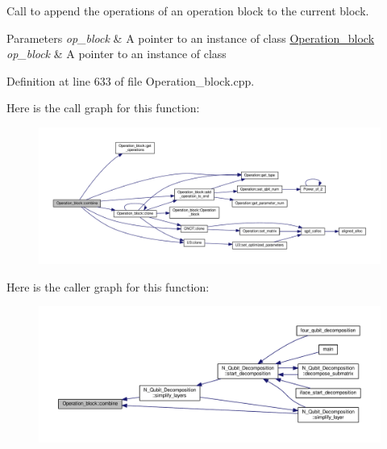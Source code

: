 Call to append the operations of an operation block to the current block. 


\begin{DoxyParams}{Parameters}
{\em op\+\_\+block} & A pointer to an instance of class \hyperlink{class_operation__block}{Operation\+\_\+block}\\
\hline
{\em op\+\_\+block} & A pointer to an instance of class  \\
\hline
\end{DoxyParams}


Definition at line 633 of file Operation\+\_\+block.\+cpp.



Here is the call graph for this function\+:
\nopagebreak
\begin{figure}[H]
\begin{center}
\leavevmode
\includegraphics[width=350pt]{class_operation__block_a60062cf6f48ebfdcaae9db3367a66147_cgraph}
\end{center}
\end{figure}




Here is the caller graph for this function\+:
\nopagebreak
\begin{figure}[H]
\begin{center}
\leavevmode
\includegraphics[width=350pt]{class_operation__block_a60062cf6f48ebfdcaae9db3367a66147_icgraph}
\end{center}
\end{figure}


